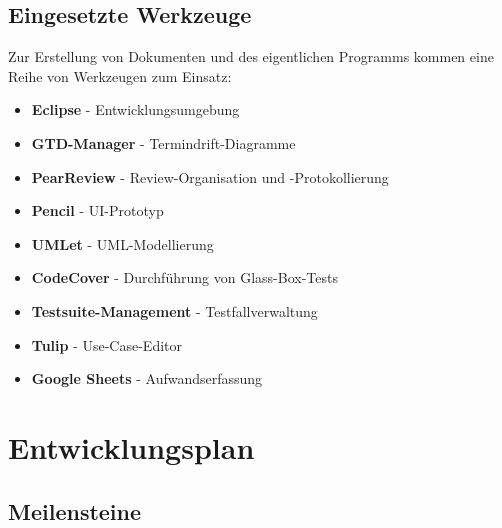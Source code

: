 \documentclass[11pt]{article}
\begin{document}
\subsection{Eingesetzte Werkzeuge}

Zur Erstellung von Dokumenten und des eigentlichen Programms kommen eine Reihe von Werkzeugen zum Einsatz:

\begin{itemize}
	\item \textbf{Eclipse} - Entwicklungsumgebung
	\item \textbf{GTD-Manager} - Termindrift-Diagramme
	\item \textbf{PearReview} - Review-Organisation und -Protokollierung
	\item \textbf{Pencil} - UI-Prototyp
	\item \textbf{UMLet} - UML-Modellierung
	\item \textbf{CodeCover} - Durchführung von Glass-Box-Tests
	\item \textbf{Testsuite-Management} - Testfallverwaltung
	\item \textbf{Tulip} - Use-Case-Editor
	\item \textbf{Google Sheets} - Aufwandserfassung
\end{itemize}

\section{Entwicklungsplan}

\subsection{Meilensteine}
\end{document}
